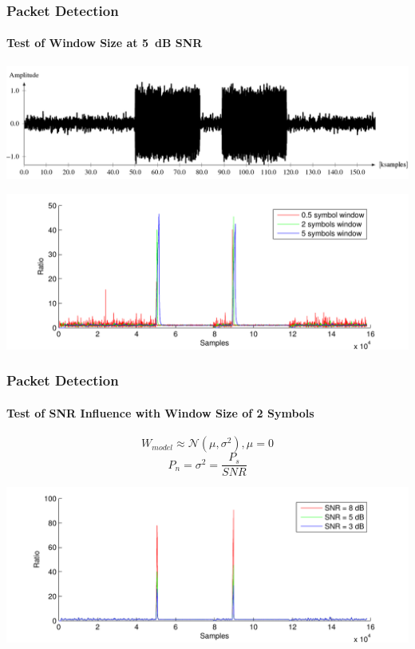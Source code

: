 \begin{frame} \frametitle{Packet Detection}
    \framesubtitle{Test of Window Size at \SI{5}{dB} SNR}
 
    \begin{center}
        \includegraphics[width=\textwidth]{img/dsw3}
    \end{center}

    \begin{center}
        \includegraphics[width=\textwidth]{img/dsw6}
    \end{center}
\end{frame}


\begin{frame} \frametitle{Packet Detection}
    \framesubtitle{Test of SNR Influence with Window Size of 2 Symbols}
    
    \begin{equation*}
        W_{model} \approx \mathcal{N}(\mu,\sigma^2) , \mu=0
    \end{equation*}    
    \begin{equation*}
        P_n = \sigma^2 = \frac{P_s}{SNR}
    \end{equation*}    
    \begin{center}
        \includegraphics[width=\textwidth]{img/dsw5}
    \end{center}

\end{frame}

